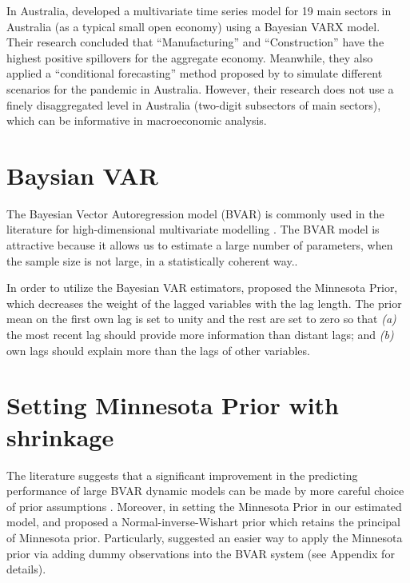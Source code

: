 \documentclass{monashthesis}
\begin{document}
In Australia, \textcite{anderson2020} developed a multivariate time series model for 19 main sectors in Australia (as a typical small open economy) using a Bayesian VARX model. Their research concluded that ``Manufacturing'' and ``Construction'' have the highest positive spillovers for the aggregate economy. Meanwhile, they also applied a ``conditional forecasting'' method proposed by \textcite{waggoner1999} to simulate different scenarios for the pandemic in Australia. However, their research does not use a finely disaggregated level in Australia (two-digit subsectors of main sectors), which can be informative in macroeconomic analysis.

\hypertarget{baysian-var}{%
\section{Baysian VAR}\label{baysian-var}}

The Bayesian Vector Autoregression model (BVAR) is commonly used in the literature for high-dimensional multivariate modelling \autocites[e.g.][]{anderson2020,litterman1986,banbura2010large}. The BVAR model is attractive because it allows us to estimate a large number of parameters, when the sample size is not large, in a statistically coherent way.\autocite{litterman1986,wozniak2016bayesian}.

In order to utilize the Bayesian VAR estimators, \textcite{litterman1979} proposed the Minnesota Prior, which decreases the weight of the lagged variables with the lag length. The prior mean on the first own lag is set to unity and the rest are set to zero so that \emph{(a)} the most recent lag should provide more information than distant lags; and \emph{(b)} own lags should explain more than the lags of other variables.

\hypertarget{setting-minnesota-prior-with-shrinkage}{%
\section{Setting Minnesota Prior with shrinkage}\label{setting-minnesota-prior-with-shrinkage}}

The literature suggests that a significant improvement in the predicting performance of large BVAR dynamic models can be made by more careful choice of prior assumptions \autocite{banbura2010large,litterman1986}. Moreover, in setting the Minnesota Prior in our estimated model, \textcite{robertson1999vector} and \textcite{kadiyala1997} proposed a Normal-inverse-Wishart prior which retains the principal of Minnesota prior. Particularly, \textcite{banbura2010large} suggested an easier way to apply the Minnesota prior via adding dummy observations into the BVAR system (see Appendix for details).
\end{document}
